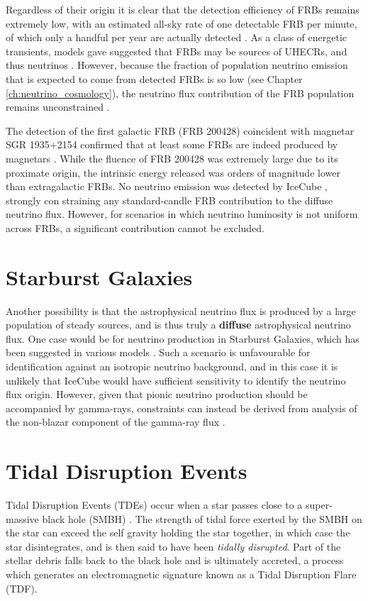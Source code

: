 Regardless of their origin it is clear that the detection efficiency of FRBs remains extremely low, with an estimated all-sky rate of one detectable FRB per minute, of which only a handful per year are actually detected \cite{petroff_frb_19}. As a class of energetic transients, models gave suggested that FRBs may be sources of UHECRs, and thus neutrinos . However, because the fraction of population neutrino emission that is expected to come from detected FRBs is so low (see Chapter \ref{ch:neutrino_cosmology}), the neutrino flux contribution of the FRB population remains unconstrained .

The detection of the first galactic FRB (FRB 200428) coincident with magnetar SGR 1935+2154 confirmed that at least some FRBs are indeed produced by magnetars . While the fluence of FRB 200428 was extremely large due to its proximate origin, the intrinsic energy released was orders of magnitude lower than extragalactic FRBs. No neutrino emission was detected by IceCube , strongly con straining any standard-candle FRB contribution to the diffuse neutrino flux. However, for scenarios in which neutrino luminosity is not uniform across FRBs, a significant contribution cannot be excluded.

\section{Starburst Galaxies}
Another possibility is that the astrophysical neutrino flux is produced by a large population of steady sources, and is thus truly a \textbf{diffuse} astrophysical neutrino flux. One case would be for neutrino production in Starburst Galaxies, which has been suggested in various models . Such a scenario is unfavourable for identification against an isotropic neutrino background, and in this case it is unlikely that IceCube would have sufficient sensitivity to identify the neutrino flux origin. However, given that pionic neutrino production should be accompanied by gamma-rays, constraints can instead be derived from analysis of the non-blazar component of the gamma-ray flux .

\section{Tidal Disruption Events}
\label{sec:tde}

Tidal Disruption Events (TDEs) occur when a star passes close to a super-massive black hole (SMBH) . The strength of tidal force exerted by the SMBH on the star can exceed the self gravity holding the star together, in which case the star disintegrates, and is then said to have been \emph{tidally disrupted}. Part of the stellar debris falls back to the black hole and is ultimately accreted, a process which generates an electromagnetic signature known as a Tidal Disruption Flare (TDF).

